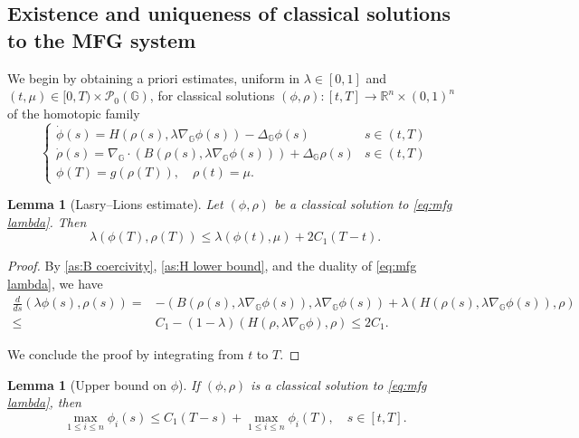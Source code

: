 \documentclass[10pt]{article}
\newtheorem{lemma}[theorem]{Lemma}
\numberwithin{equation}{section}
\newcommand{\cP}{ \mathcal{P}}
\newcommand{\R}{\mathbb R}
\def\R{{\mathbb{R}}}
\def\G{\mathbb{G}}
\begin{document}
\subsection{Existence and uniqueness of classical solutions to the MFG system}
%
We begin by obtaining a priori estimates, uniform in $\lambda\in[0,1]$ and $(t,\mu)\in[0,T)\times\cP_0(\G)$, for classical solutions $(\phi,\rho):[t,T]\to\R^n\times(0,1)^n$ of the homotopic family
\begin{equation}  \label{eq:mfg lambda}
    \begin{cases} \dot \phi(s)= H(\rho(s),\lambda\nabla_{\G}\phi(s))-\Delta_{\G}\phi(s)& s\in (t,T)\\
    \dot \rho(s)=\nabla_{\G}\cdot (B(\rho(s),\lambda\nabla_{\G}\phi(s)))+\Delta_{\G}\rho(s)& s\in (t,T)\\
    \phi(T)= g(\rho(T)), \quad \rho(t)=\mu.
    \end{cases}
\end{equation}
%
%
\begin{lemma}[Lasry--Lions estimate] \label{lem:lasrylions} Let $(\phi,\rho)$ be a classical solution to \eqref{eq:mfg lambda}. Then
\begin{equation}
\lambda ( \phi(T),\rho(T))\leq \lambda ( \phi(t),\mu)+2C_1(T-t).
\end{equation}
\end{lemma}
\begin{proof}
By \eqref{as:B coercivity}, \eqref{as:H lower bound}, and the duality of \eqref{eq:mfg lambda}, we have
\begin{align*}
    \frac{d}{ds}(\lambda\phi(s),\rho(s))=&- (B(\rho(s),\lambda \nabla_{\G}\phi(s)), \lambda\nabla_{\G}\phi(s)) + \lambda (H(\rho(s),\lambda \nabla_{\G}\phi(s)) ,\rho)  \\
 \leq & C_1- (1-\lambda) (H(\rho,\lambda \nabla_{\G}\phi), \rho)\leq 2 C_1.
\end{align*}

We conclude the proof by integrating from $t$ to $T$.
\end{proof}
\begin{lemma}[Upper bound on $\phi$] \label{lem:upper phi} If $(\phi,\rho)$ is a classical solution to \eqref{eq:mfg lambda}, then
    \begin{equation}
        \max_{1\leq i \leq n} \phi_i(s) \leq  C_1(T-s)+\max_{1\leq i\leq n}  \phi_i(T), \quad s\in [t, T].
    \end{equation}
\end{lemma}
\end{document}
